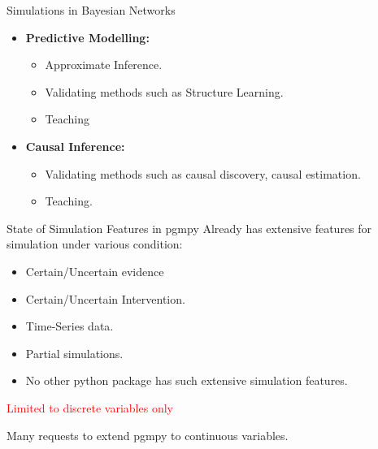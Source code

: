 \documentclass{beamer}
\begin{document}
\begin{frame}{Simulations in Bayesian Networks}
	\begin{itemize}
		\item \textbf{Predictive Modelling:}
			\begin{itemize}
				\item Approximate Inference.
				\item Validating methods such as Structure Learning.
				\item Teaching
			\end{itemize}
		\item \textbf{Causal Inference:}
			\begin{itemize}
				\item Validating methods such as causal discovery, causal estimation.
				\item Teaching.
			\end{itemize}
	\end{itemize}
\end{frame}

\begin{frame}{State of Simulation Features in pgmpy}
	Already has extensive features for simulation under various condition:
	\begin{itemize}
		\item Certain/Uncertain evidence
		\item Certain/Uncertain Intervention.
		\item Time-Series data.
		\item Partial simulations.
	\end{itemize}

	\vspace{1em}
	\begin{itemize}
		\item No other python package has such extensive simulation features.
	\end{itemize}

	\vspace{3em}
	\centerline{\textcolor{red}{Limited to discrete variables only}}
	\centerline{Many requests to extend pgmpy to continuous variables.}



\end{frame}
\end{document}

